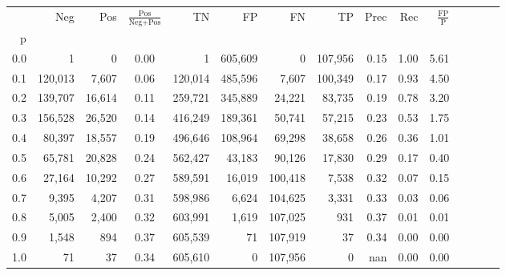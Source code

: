 \begin{tabular}{rrrcrrrrrrrrrrr}
\toprule
{} &      Neg &     Pos & $\frac{\text{Pos}}{\text{Neg}+\text{Pos}}$ &       TN &       FP &       FN &       TP &  Prec &   Rec & $\frac{\text{FP}}{\text{P}}$ \\
p   &          &         &                                            &          &          &          &          &       &       &                              \\
\midrule
0.0 &        1 &       0 &                                       0.00 &        1 &  605,609 &        0 &  107,956 &  0.15 &  1.00 &                         5.61 \\
0.1 &  120,013 &   7,607 &                                       0.06 &  120,014 &  485,596 &    7,607 &  100,349 &  0.17 &  0.93 &                         4.50 \\
0.2 &  139,707 &  16,614 &                                       0.11 &  259,721 &  345,889 &   24,221 &   83,735 &  0.19 &  0.78 &                         3.20 \\
0.3 &  156,528 &  26,520 &                                       0.14 &  416,249 &  189,361 &   50,741 &   57,215 &  0.23 &  0.53 &                         1.75 \\
0.4 &   80,397 &  18,557 &                                       0.19 &  496,646 &  108,964 &   69,298 &   38,658 &  0.26 &  0.36 &                         1.01 \\
0.5 &   65,781 &  20,828 &                                       0.24 &  562,427 &   43,183 &   90,126 &   17,830 &  0.29 &  0.17 &                         0.40 \\
0.6 &   27,164 &  10,292 &                                       0.27 &  589,591 &   16,019 &  100,418 &    7,538 &  0.32 &  0.07 &                         0.15 \\
0.7 &    9,395 &   4,207 &                                       0.31 &  598,986 &    6,624 &  104,625 &    3,331 &  0.33 &  0.03 &                         0.06 \\
0.8 &    5,005 &   2,400 &                                       0.32 &  603,991 &    1,619 &  107,025 &      931 &  0.37 &  0.01 &                         0.01 \\
0.9 &    1,548 &     894 &                                       0.37 &  605,539 &       71 &  107,919 &       37 &  0.34 &  0.00 &                         0.00 \\
1.0 &       71 &      37 &                                       0.34 &  605,610 &        0 &  107,956 &        0 &   nan &  0.00 &                         0.00 \\
\bottomrule
\end{tabular}
